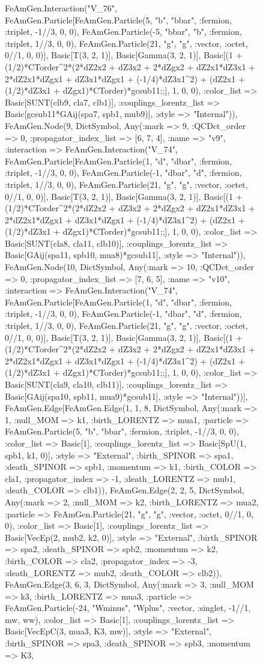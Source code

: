 \documentclass{revtex4}
\begin{document}
\begin{figure}[!htb]
\begin{center}
{FeAmGen.Interaction("V_76", FeAmGen.Particle[FeAmGen.Particle(5, "b", "bbar", :fermion, :triplet, -1//3, 0, 0), FeAmGen.Particle(-5, "bbar", "b", :fermion, :triplet, 1//3, 0, 0), FeAmGen.Particle(21, "g", "g", :vector, :octet, 0//1, 0, 0)], Basic[T(3, 2, 1)], Basic[Gamma(3, 2, 1)], Basic[(1 + (1/2)*CTorder^2*(2*dZ2x2 + dZ3x2 + 2*dZgx2 + dZ2x1*dZ3x1 + 2*dZ2x1*dZgx1 + dZ3x1*dZgx1 + (-1/4)*dZ3x1^2) + (dZ2x1 + (1/2)*dZ3x1 + dZgx1)*CTorder)*gcsub11;;], 1, 0, 0), :color_list => Basic[SUNT(clb9, cla7, clb1)], :couplings_lorentz_list => Basic[gcsub11*GAij(spa7, spb1, mub9)], :style => "Internal")), FeAmGen.Node(9, Dict{Symbol, Any}(:mark => 9, :QCDct_order => 0, :propagator_index_list => [6, 7, 4], :name => "v9", :interaction => FeAmGen.Interaction("V_74", FeAmGen.Particle[FeAmGen.Particle(1, "d", "dbar", :fermion, :triplet, -1//3, 0, 0), FeAmGen.Particle(-1, "dbar", "d", :fermion, :triplet, 1//3, 0, 0), FeAmGen.Particle(21, "g", "g", :vector, :octet, 0//1, 0, 0)], Basic[T(3, 2, 1)], Basic[Gamma(3, 2, 1)], Basic[(1 + (1/2)*CTorder^2*(2*dZ2x2 + dZ3x2 + 2*dZgx2 + dZ2x1*dZ3x1 + 2*dZ2x1*dZgx1 + dZ3x1*dZgx1 + (-1/4)*dZ3x1^2) + (dZ2x1 + (1/2)*dZ3x1 + dZgx1)*CTorder)*gcsub11;;], 1, 0, 0), :color_list => Basic[SUNT(cla8, cla11, clb10)], :couplings_lorentz_list => Basic[GAij(spa11, spb10, mua8)*gcsub11], :style => "Internal")), FeAmGen.Node(10, Dict{Symbol, Any}(:mark => 10, :QCDct_order => 0, :propagator_index_list => [7, 6, 5], :name => "v10", :interaction => FeAmGen.Interaction("V_74", FeAmGen.Particle[FeAmGen.Particle(1, "d", "dbar", :fermion, :triplet, -1//3, 0, 0), FeAmGen.Particle(-1, "dbar", "d", :fermion, :triplet, 1//3, 0, 0), FeAmGen.Particle(21, "g", "g", :vector, :octet, 0//1, 0, 0)], Basic[T(3, 2, 1)], Basic[Gamma(3, 2, 1)], Basic[(1 + (1/2)*CTorder^2*(2*dZ2x2 + dZ3x2 + 2*dZgx2 + dZ2x1*dZ3x1 + 2*dZ2x1*dZgx1 + dZ3x1*dZgx1 + (-1/4)*dZ3x1^2) + (dZ2x1 + (1/2)*dZ3x1 + dZgx1)*CTorder)*gcsub11;;], 1, 0, 0), :color_list => Basic[SUNT(cla9, cla10, clb11)], :couplings_lorentz_list => Basic[GAij(spa10, spb11, mua9)*gcsub11], :style => "Internal"))], FeAmGen.Edge[FeAmGen.Edge(1, 1, 8, Dict{Symbol, Any}(:mark => 1, :null_MOM => k1, :birth_LORENTZ => mua1, :particle => FeAmGen.Particle(5, "b", "bbar", :fermion, :triplet, -1//3, 0, 0), :color_list => Basic[1], :couplings_lorentz_list => Basic[SpU(1, spb1, k1, 0)], :style => "External", :birth_SPINOR => spa1, :death_SPINOR => spb1, :momentum => k1, :birth_COLOR => cla1, :propagator_index => -1, :death_LORENTZ => mub1, :death_COLOR => clb1)), FeAmGen.Edge(2, 2, 5, Dict{Symbol, Any}(:mark => 2, :null_MOM => k2, :birth_LORENTZ => mua2, :particle => FeAmGen.Particle(21, "g", "g", :vector, :octet, 0//1, 0, 0), :color_list => Basic[1], :couplings_lorentz_list => Basic[VecEp(2, mub2, k2, 0)], :style => "External", :birth_SPINOR => spa2, :death_SPINOR => spb2, :momentum => k2, :birth_COLOR => cla2, :propagator_index => -3, :death_LORENTZ => mub2, :death_COLOR => clb2)), FeAmGen.Edge(3, 6, 3, Dict{Symbol, Any}(:mark => 3, :null_MOM => k3, :birth_LORENTZ => mua3, :particle => FeAmGen.Particle(-24, "Wminus", "Wplus", :vector, :singlet, -1//1, mw, ww), :color_list => Basic[1], :couplings_lorentz_list => Basic[VecEpC(3, mua3, K3, mw)], :style => "External", :birth_SPINOR => spa3, :death_SPINOR => spb3, :momentum => K3, }
\end{center}
\end{figure}
\end{document}
